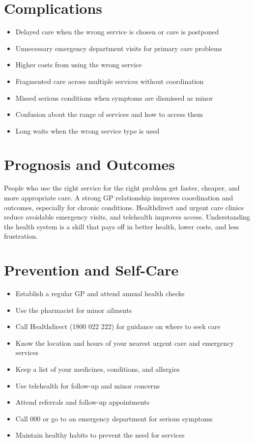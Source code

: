 \section*{Complications}
\begin{itemize}
    \item Delayed care when the wrong service is chosen or care is postponed
    \item Unnecessary emergency department visits for primary care problems
    \item Higher costs from using the wrong service
    \item Fragmented care across multiple services without coordination
    \item Missed serious conditions when symptoms are dismissed as minor
    \item Confusion about the range of services and how to access them
    \item Long waits when the wrong service type is used
\end{itemize}

\section*{Prognosis and Outcomes}
People who use the right service for the right problem get faster, cheaper, and more appropriate care. A strong GP relationship improves coordination and outcomes, especially for chronic conditions. Healthdirect and urgent care clinics reduce avoidable emergency visits, and telehealth improves access. Understanding the health system is a skill that pays off in better health, lower costs, and less frustration.

\section*{Prevention and Self-Care}
\begin{itemize}
    \item Establish a regular GP and attend annual health checks
    \item Use the pharmacist for minor ailments
    \item Call Healthdirect (1800 022 222) for guidance on where to seek care
    \item Know the location and hours of your nearest urgent care and emergency services
    \item Keep a list of your medicines, conditions, and allergies
    \item Use telehealth for follow-up and minor concerns
    \item Attend referrals and follow-up appointments
    \item Call 000 or go to an emergency department for serious symptoms
    \item Maintain healthy habits to prevent the need for services
\end{itemize}

